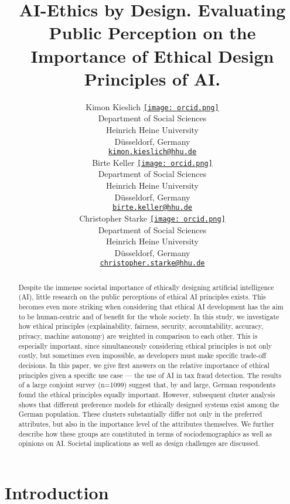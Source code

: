 \documentclass{article}
\title{AI-Ethics by Design. Evaluating Public Perception on the
Importance of Ethical Design Principles of AI.}
\author{
    Kimon Kieslich
    \href{https://orcid.org/0000-0002-6305-2997}{\texttt{[image: orcid.png]}}
   \\
    Department of Social Sciences \\
    Heinrich Heine University \\
  Düsseldorf, Germany \\
  \texttt{\href{mailto:kimon.kieslich@hhu.de}{\nolinkurl{kimon.kieslich@hhu.de}}} \\
   \And
    Birte Keller
    \href{https://orcid.org/0000-0002-3145-5206}{\texttt{[image: orcid.png]}}
   \\
    Department of Social Sciences \\
    Heinrich Heine University \\
  Düsseldorf, Germany \\
  \texttt{\href{mailto:birte.keller@hhu.de}{\nolinkurl{birte.keller@hhu.de}}} \\
   \And
    Christopher Starke
    \href{https://orcid.org/0000-0001-7899-6029}{\texttt{[image: orcid.png]}}
   \\
    Department of Social Sciences \\
    Heinrich Heine University \\
  Düsseldorf, Germany \\
  \texttt{\href{mailto:christopher.starke@hhu.de}{\nolinkurl{christopher.starke@hhu.de}}} \\
  }
\begin{document}
\maketitle

\def\tightlist{}


\begin{abstract}
Despite the immense societal importance of ethically designing
artificial intelligence (AI), little research on the public perceptions
of ethical AI principles exists. This becomes even more striking when
considering that ethical AI development has the aim to be human-centric
and of benefit for the whole society. In this study, we investigate how
ethical principles (explainability, fairness, security, accountability,
accuracy, privacy, machine autonomy) are weighted in comparison to each
other. This is especially important, since simultaneously considering
ethical principles is not only costly, but sometimes even impossible, as
developers must make specific trade-off decisions. In this paper, we
give first answers on the relative importance of ethical principles
given a specific use case --- the use of AI in tax fraud detection. The
results of a large conjoint survey (n=1099) suggest that, by and large,
German respondents found the ethical principles equally important.
However, subsequent cluster analysis shows that different preference
models for ethically designed systems exist among the German population.
These clusters substantially differ not only in the preferred
attributes, but also in the importance level of the attributes
themselves. We further describe how these groups are constituted in
terms of sociodemographics as well as opinions on AI. Societal
implications as well as design challenges are discussed.
\end{abstract}


\hypertarget{introduction}{%
\section{Introduction}\label{introduction}}
\end{document}
